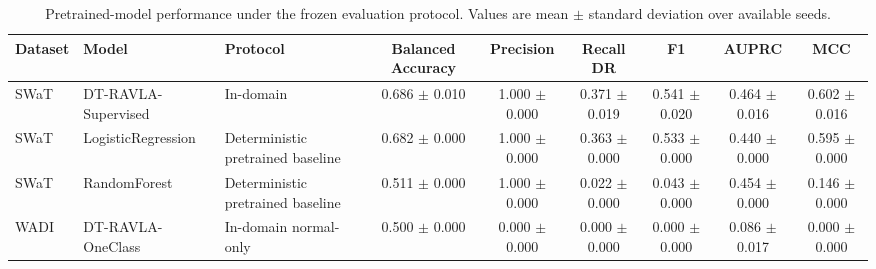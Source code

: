\begin{table}[t]
\centering
\caption{Pretrained-model performance under the frozen evaluation protocol. Values are mean $\pm$ standard deviation over available seeds.}
\label{tab:pretrained_benchmark}
\renewcommand{\arraystretch}{1.12}
\setlength{\tabcolsep}{4pt}
\begin{tabular}{lllcccccc}
\hline
Dataset & Model & Protocol & Balanced Accuracy & Precision & Recall DR & F1 & AUPRC & MCC \\
\hline
SWaT & DT-RAVLA-Supervised & In-domain & 0.686 $\pm$ 0.010 & 1.000 $\pm$ 0.000 & 0.371 $\pm$ 0.019 & 0.541 $\pm$ 0.020 & 0.464 $\pm$ 0.016 & 0.602 $\pm$ 0.016 \\
SWaT & LogisticRegression & Deterministic pretrained baseline & 0.682 $\pm$ 0.000 & 1.000 $\pm$ 0.000 & 0.363 $\pm$ 0.000 & 0.533 $\pm$ 0.000 & 0.440 $\pm$ 0.000 & 0.595 $\pm$ 0.000 \\
SWaT & RandomForest & Deterministic pretrained baseline & 0.511 $\pm$ 0.000 & 1.000 $\pm$ 0.000 & 0.022 $\pm$ 0.000 & 0.043 $\pm$ 0.000 & 0.454 $\pm$ 0.000 & 0.146 $\pm$ 0.000 \\
WADI & DT-RAVLA-OneClass & In-domain normal-only & 0.500 $\pm$ 0.000 & 0.000 $\pm$ 0.000 & 0.000 $\pm$ 0.000 & 0.000 $\pm$ 0.000 & 0.086 $\pm$ 0.017 & 0.000 $\pm$ 0.000 \\
\hline
\end{tabular}
\end{table}